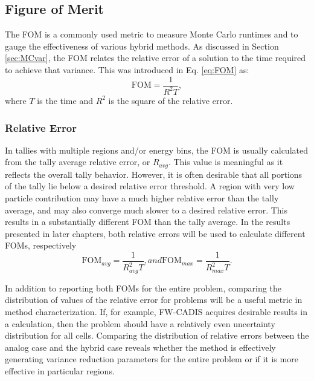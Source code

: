 \subsection{Figure of Merit}

The FOM is a commonly used metric to measure Monte Carlo
runtimes and to gauge the effectiveness of various hybrid methods. As discussed
in Section \ref{sec:MCvar}, the FOM relates the relative error of a solution to the
time required to achieve that variance. This was introduced in Eq.
\eqref{eq:FOM} as:
\begin{equation*}
  \text{FOM} = \frac{1}{R^{2}T} ,
\end{equation*}
where $T$ is the time and $R^{2}$ is the square of the relative error.

\subsubsection{Relative Error}

In tallies with multiple regions and/or energy bins, the FOM is usually calculated
from the tally average relative error, or $R_{avg}$. This value is meaningful as
it reflects the overall tally behavior. However, it is often desirable that all
portions of the tally lie below a desired relative error threshold. A region
with very low particle contribution may have a much higher relative error than
the tally average, and may also converge much slower to a desired relative
error. This results in a substantially different FOM than
the tally average. In the results presented in later chapters, both relative
errors will be used to calculate different FOMs, respectively
\begin{subequations}
  \begin{equation}
    \text{FOM}_{avg} = \frac{1}{R_{avg}^{2}T},
  \label{eq:FOMavg}
  \end{equation}
and
  \begin{equation}
    \text{FOM}_{max} = \frac{1}{R_{max}^{2}T} .
  \label{eq:FOMmax}
  \end{equation}
  \label{eq:FOMerror}
\end{subequations}

In addition to reporting both FOMs for the entire problem, comparing the
distribution of values of the relative error for problems will be a useful
metric in method characterization. If, for example, FW-CADIS acquires desirable
results in a calculation, then the problem should have a relatively even uncertainty
distribution for all cells. Comparing the distribution of relative errors
between the analog case and the hybrid case reveals whether the method is
effectively generating variance reduction parameters for the entire problem or
if it is more effective in particular regions.

